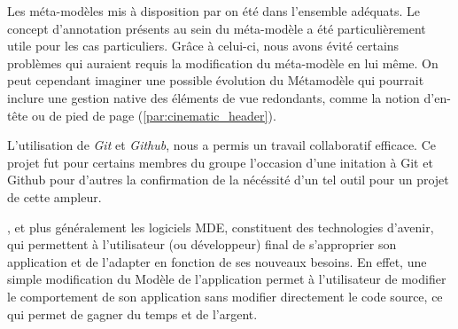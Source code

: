 Les méta-modèles mis à disposition par \kwobeo{} on été dans l'ensemble adéquats. Le concept d'annotation présents au sein du méta-modèle \kwentity{} a été particulièrement utile pour les cas particuliers. Grâce à celui-ci, nous avons évité certains problèmes qui auraient requis la modification du méta-modèle en lui même. On peut cependant imaginer une possible évolution du Métamodèle \kwcinematic qui pourrait inclure une gestion native des éléments de vue redondants, comme la notion d'en-tête ou de pied de page (\ref{par:cinematic_header}).

L'utilisation de \textit{Git} et \textit{Github}, nous a permis un travail collaboratif efficace. Ce projet fut pour certains membres du groupe l'occasion d'une initation à Git et Github pour d'autres la confirmation de la nécéssité d'un tel outil pour un projet de cette ampleur.

\kwacceleo{}, et plus généralement les logiciels MDE, constituent des technologies d'avenir, qui permettent à l'utilisateur (ou développeur) final de s'approprier son application et de l'adapter en fonction de ses nouveaux besoins. En effet, une simple modification du Modèle de l'application permet à l'utilisateur de modifier le comportement de son application sans modifier directement le code source, ce qui permet de gagner du temps et de l'argent.



